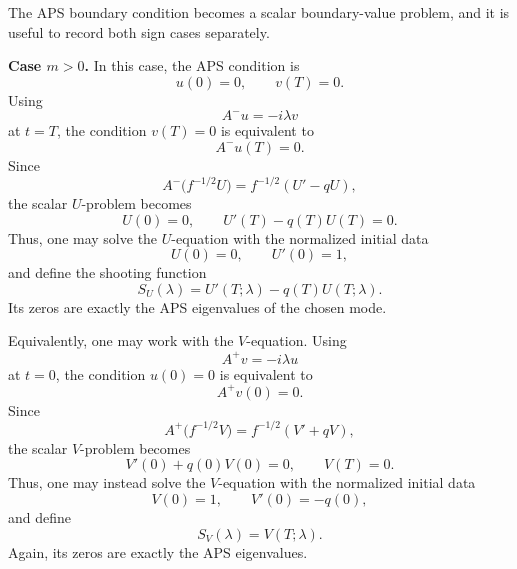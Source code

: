 \documentclass[11pt]{article}
\theoremstyle{definition}
\numberwithin{equation}{section}
\begin{document}
The APS boundary condition becomes a scalar boundary-value problem, and it is useful to record both sign cases separately.

\medskip
\noindent
\textbf{Case \(m>0\).}
In this case, the APS condition is
\begin{equation}
u(0)=0,
\qquad
v(T)=0.
\end{equation}
Using
\begin{equation}
A^-u=-i\lambda v
\end{equation}
at \(t=T\), the condition \(v(T)=0\) is equivalent to
\begin{equation}
A^-u(T)=0.
\end{equation}
Since
\begin{equation}
A^-\!\bigl(f^{-1/2}U\bigr)=f^{-1/2}(U'-qU),
\end{equation}
the scalar \(U\)-problem becomes
\begin{equation}
U(0)=0,
\qquad
U'(T)-q(T)U(T)=0.
\end{equation}
Thus, one may solve the \(U\)-equation with the normalized initial data
\begin{equation}
U(0)=0,
\qquad
U'(0)=1,
\end{equation}
and define the shooting function
\begin{equation}
S_U(\lambda)=U'(T;\lambda)-q(T)U(T;\lambda).
\end{equation}
Its zeros are exactly the APS eigenvalues of the chosen mode.

Equivalently, one may work with the \(V\)-equation. Using
\begin{equation}
A^+v=-i\lambda u
\end{equation}
at \(t=0\), the condition \(u(0)=0\) is equivalent to
\begin{equation}
A^+v(0)=0.
\end{equation}
Since
\begin{equation}
A^+\!\bigl(f^{-1/2}V\bigr)=f^{-1/2}(V'+qV),
\end{equation}
the scalar \(V\)-problem becomes
\begin{equation}
V'(0)+q(0)V(0)=0,
\qquad
V(T)=0.
\end{equation}
Thus, one may instead solve the \(V\)-equation with the normalized initial data
\begin{equation}
V(0)=1,
\qquad
V'(0)=-q(0),
\end{equation}
and define
\begin{equation}
S_V(\lambda)=V(T;\lambda).
\end{equation}
Again, its zeros are exactly the APS eigenvalues.
\end{document}
